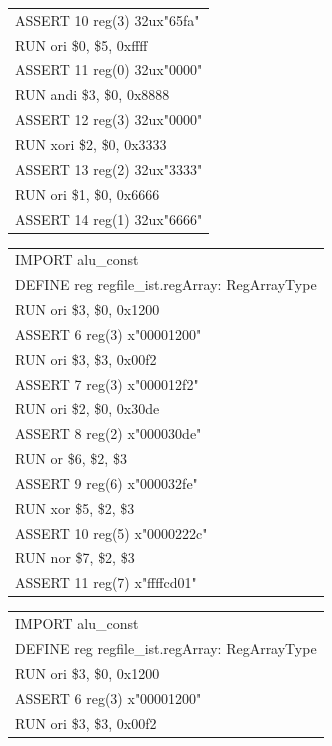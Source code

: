 \documentclass[11pt,utf8]{article}
\begin{document}
{{{\begin{center}
\begin{longtable}{p{15cm}}
		ASSERT{ }10{ }reg(3){ }32ux"65fa"\\
		RUN{ }ori{ }\$0,{ }\$5,{ }0xffff\\
		ASSERT{ }11{ }reg(0){ }32ux"0000"\\
		RUN{ }andi{ }\$3,{ }\$0,{ }0x8888\\
		ASSERT{ }12{ }reg(3){ }32ux"0000"\\
		RUN{ }xori{ }\$2,{ }\$0,{ }0x3333\\
		ASSERT{ }13{ }reg(2){ }32ux"3333"\\
		RUN{ }ori{ }\$1,{ }\$0,{ }0x6666\\
		ASSERT{ }14{ }reg(1){ }32ux"6666"\\
		\hline \end{longtable} \end{center}
\begin{center}	\begin{longtable}{p{15cm}} \hline
		IMPORT{ }alu\_const\\
		DEFINE{ }reg{ }regfile\_ist.regArray:{ }RegArrayType\\
		RUN{ }ori{ }\$3,{ }\$0,{ }0x1200\\
		ASSERT{ }6{ }reg(3){ }x"00001200"\\
		RUN{ }ori{ }\$3,{ }\$3,{ }0x00f2\\
		ASSERT{ }7{ }reg(3){ }x"000012f2"\\
		RUN{ }ori{ }\$2,{ }\$0,{ }0x30de\\
		ASSERT{ }8{ }reg(2){ }x"000030de"\\
		RUN{ }or{ }\$6,{ }\$2,{ }\$3\\
		ASSERT{ }9{ }reg(6){ }x"000032fe"\\
		RUN{ }xor{ }\$5,{ }\$2,{ }\$3\\
		ASSERT{ }10{ }reg(5){ }x"0000222c"\\
		RUN{ }nor{ }\$7,{ }\$2,{ }\$3\\
		ASSERT{ }11{ }reg(7){ }x"ffffcd01"\\
		\hline \end{longtable} \end{center}
\begin{center}	\begin{longtable}{p{15cm}} \hline
		IMPORT{ }alu\_const\\
		DEFINE{ }reg{ }regfile\_ist.regArray:{ }RegArrayType\\
		RUN{ }ori{ }\$3,{ }\$0,{ }0x1200\\
		ASSERT{ }6{ }reg(3){ }x"00001200"\\
		RUN{ }ori{ }\$3,{ }\$3,{ }0x00f2\\

\end{longtable}
\end{center}}}}
\end{document}

